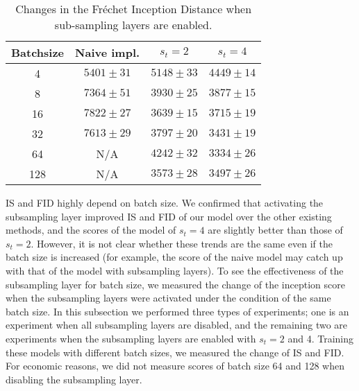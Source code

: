 \documentclass[twocolumn]{svjour3}
\begin{document}
\begin{table}
\centering
{\renewcommand{\arraystretch}{1.2}
\begin{tabular}{c|ccc}
Batchsize & Naive impl. & $s_t = 2$ & $s_t = 4$ \\ \hline \hline
4 & {$5401 \pm 31$} & ${5148 \pm 33}$ & ${4449 \pm 14}$ \\
8 & {$7364 \pm 51$} & {$3930 \pm 25$} & ${3877 \pm 15}$ \\
16 & {$7822 \pm 27$} & {$3639 \pm 15$} & ${3715 \pm 19}$ \\
32 & {$7613 \pm 29$} & {$3797 \pm 20$} & ${3431 \pm 19}$ \\
64 & N/A & ${4242 \pm 32}$ & ${3334 \pm 26}$ \\
128 & N/A & {$3573 \pm 28$} & {$3497 \pm 26$} \\ \hline
\end{tabular}
}
\caption{Changes in the Fr\'echet Inception Distance when sub-sampling layers are enabled.}
\label{table:fr_fid}
\end{table}


















IS and FID highly depend on batch size.
We confirmed that activating the subsampling layer improved IS and FID of our model over the other existing methods,
and the scores of the model of $s_t=4$ are slightly better than those of $s_t=2$.
However, it is not clear whether these trends are the same even if the batch size is increased
(for example, the score of the naive model may catch up with that of the model with subsampling layers).
To see the effectiveness of the subsampling layer for batch size,
we measured the change of the inception score when the subsampling layers were activated
under the condition of the same batch size.
In this subsection we performed three types of experiments;
one is an experiment when all subsampling layers are disabled,
and the remaining two are experiments when the subsampling layers are enabled with $s_t=2$ and 4.
Training these models with different batch sizes,
we measured the change of IS and FID.
For economic reasons, we did not measure scores of batch size 64 and 128
when disabling the subsampling layer.
\end{document}
